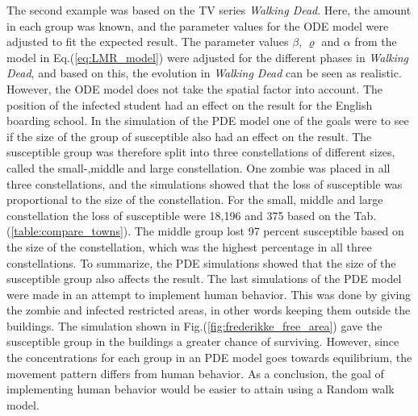 \documentclass[%
twoside,                 %
final,                   %
chapterprefix=true,      %
open=right               %
10pt]{book}
\begin{document}
The second example was based on the TV series \emph{Walking Dead}. Here, the amount in each group was known, and the parameter values for the ODE model were adjusted to fit the expected result. The parameter values $\beta$, $\varrho$ and $\alpha$ from the model in Eq.(\ref{eq:LMR_model}) were adjusted for the different phases in \emph{Walking Dead}, and based on this, the evolution in \emph{Walking Dead} can be seen as realistic. However, the ODE model does not take the spatial factor into account. The position of the infected student had an effect on the result for the English boarding school. In the simulation of the PDE model one of the goals were to see if the size of the group of susceptible also had an effect on the result. The susceptible group was therefore split into three constellations of different sizes, called the small-,middle and large constellation. One zombie was placed in all three constellations, and the simulations showed that the loss of susceptible was proportional to the size of the constellation. For the small, middle and large constellation the loss of susceptible were 18,196 and 375 based on the Tab.(\ref{table:compare_towns}). The middle group lost 97 percent susceptible based on the size of the constellation, which was the highest percentage in all three constellations. To summarize, the PDE simulations showed that the size of the susceptible group also affects the result. The last simulations of the PDE model were made in an attempt to implement human behavior. This was done by giving the zombie and infected restricted areas, in other words keeping them outside the buildings. The simulation shown in Fig.(\ref{fig:frederikke_free_area}) gave the susceptible group in the buildings a greater chance of surviving. However, since the concentrations for each group in an PDE model goes towards equilibrium, the movement pattern differs from human behavior. As a conclusion, the goal of implementing human behavior would be easier to attain using a Random walk model.


\vspace{3mm}




\vspace{3mm}
\end{document}

